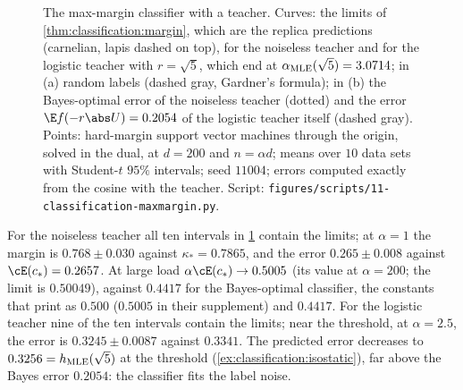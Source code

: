 \begin{refsection}
\begin{figure}[t]
\begin{fullwidth}

\vspace{1mm}
\end{fullwidth}
\caption{The max-margin classifier with a teacher. Curves: the limits of \cref{thm:classification:margin}, which are the replica predictions (carnelian, lapis dashed on top), for the noiseless teacher and for the logistic teacher with $r=\sqrt5$, which end at $\alpha_{\mathrm{MLE}}(\sqrt5)=3.0714$; in (a) random labels (dashed gray, Gardner's formula); in (b) the Bayes-optimal error of the noiseless teacher \parencite{OpperHaussler1991,BarbierEtAl2019} (dotted) and the error $\E f(-r\abs U)=0.2054$ of the logistic teacher itself (dashed gray). Points: hard-margin support vector machines through the origin, solved in the dual, at $d=200$ and $n=\alpha d$; means over $10$ data sets with Student-$t$ $95\%$ intervals; seed $11004$; errors computed exactly from the cosine with the teacher. Script: \texttt{figures/scripts/11-classification-maxmargin.py}.}\label{fig:classification:maxmargin}
\end{figure}

For the noiseless teacher all ten intervals in \cref{fig:classification:maxmargin} contain the limits; at $\alpha=1$ the margin is $0.768\pm0.030$ against $\kappa_*=0.7865$, and the error $0.265\pm0.008$ against $\cE(c_*)=0.2657$. At large load $\alpha\cE(c_*)\to0.5005$ (its value at $\alpha=200$; the limit is $0.50049$), against $0.4417$ for the Bayes-optimal classifier, the constants that \textcite{AubinEtAl2020} print as $0.500$ ($0.5005$ in their supplement) and $0.4417$. For the logistic teacher nine of the ten intervals contain the limits; near the threshold, at $\alpha=2.5$, the error is $0.3245\pm0.0087$ against $0.3341$. The predicted error decreases to $0.3256=h_{\mathrm{MLE}}(\sqrt5)$ at the threshold (\cref{ex:classification:isostatic}), far above the Bayes error $0.2054$: the classifier fits the label noise.


\end{refsection}
